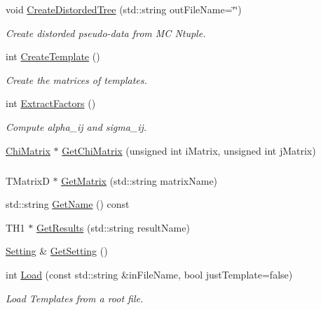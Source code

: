 \begin{DoxyCompactItemize}
void \hyperlink{classTemplateMethod_1_1Template_a232420559c163dafffd79e58b47af026}{Create\+Distorded\+Tree} (std\+::string out\+File\+Name=\char`\"{}\char`\"{})
\begin{DoxyCompactList}\small\item\em Create distorded pseudo-\/data from M\+C Ntuple. \end{DoxyCompactList}\item 
int \hyperlink{classTemplateMethod_1_1Template_a2e229b812199e36c2b3360cc9a449333}{Create\+Template} ()
\begin{DoxyCompactList}\small\item\em Create the matrices of templates. \end{DoxyCompactList}\item 
int \hyperlink{classTemplateMethod_1_1Template_ab7fd1902fd45a892381bda1e46e61c41}{Extract\+Factors} ()
\begin{DoxyCompactList}\small\item\em Compute alpha\+\_\+ij and sigma\+\_\+ij. \end{DoxyCompactList}\item 
\hyperlink{classTemplateMethod_1_1ChiMatrix}{Chi\+Matrix} $\ast$ \hyperlink{classTemplateMethod_1_1Template_afdb8fa42512e7e7dcda69cb624947744}{Get\+Chi\+Matrix} (unsigned int i\+Matrix, unsigned int j\+Matrix)
\begin{DoxyCompactList}\small\item\em \subparagraph*{}\end{DoxyCompactList}\item 
T\+Matrix\+D $\ast$ \hyperlink{classTemplateMethod_1_1Template_a4a68dbf62c14068eac90e473c988b3ab}{Get\+Matrix} (std\+::string matrix\+Name)
\item 
std\+::string \hyperlink{classTemplateMethod_1_1Template_ae17b09a83810b399c21b5b9df33ed65b}{Get\+Name} () const 
\item 
T\+H1 $\ast$ \hyperlink{classTemplateMethod_1_1Template_ac7eaf457214cee8c5d3d871f9d0510ec}{Get\+Results} (std\+::string result\+Name)
\item 
\hyperlink{classTemplateMethod_1_1Setting}{Setting} \& \hyperlink{classTemplateMethod_1_1Template_adb290800a3d8d3594d4e5e53d977b92d}{Get\+Setting} ()
\item 
int \hyperlink{classTemplateMethod_1_1Template_a3fba1d3b893a954cbfd0c2ab0482564e}{Load} (const std\+::string \&in\+File\+Name, bool just\+Template=false)
\begin{DoxyCompactList}\small\item\em Load Templates from a root file. \end{DoxyCompactList}\item 

\end{DoxyCompactItemize}
